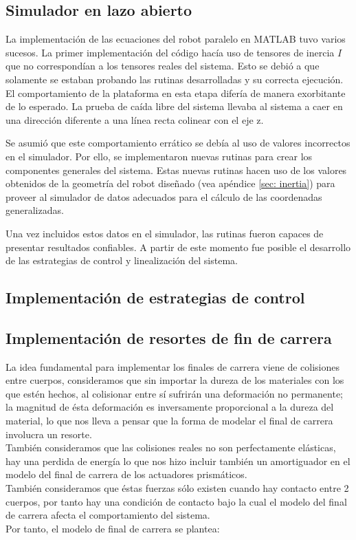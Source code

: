 \subsection{Simulador en lazo abierto}
La implementación de las ecuaciones del robot paralelo en 
MATLAB tuvo varios sucesos.
La primer implementación del código hacía uso de tensores de 
inercia $I$ que no correspondían a los tensores reales del sistema.
Esto se debió a que solamente se estaban probando las
rutinas desarrolladas y su correcta ejecución.
El comportamiento de la plataforma en esta etapa difería 
de manera exorbitante de lo esperado.
La prueba de caída libre del sistema llevaba al sistema a caer en 
una dirección diferente a una línea recta colinear con el eje z.

Se asumió que este comportamiento errático se debía al uso de 
valores incorrectos en el simulador.
Por ello, se implementaron nuevas rutinas para 
crear los componentes generales del sistema.
Estas nuevas rutinas hacen uso de los valores obtenidos de la
geometría del robot diseñado (vea apéndice \ref{sec: inertia})
para proveer al simulador de datos adecuados para
el cálculo de las coordenadas generalizadas.

Una vez incluidos estos datos en el simulador, 
las rutinas fueron capaces de 
presentar resultados confiables.
A partir de este momento fue posible el desarrollo
de las estrategias de control y 
linealización del sistema.

\subsection{Implementación de estrategias de control}





\subsection{Implementación de resortes de fin de carrera}
La idea fundamental para implementar los finales de carrera viene de colisiones entre cuerpos, consideramos que sin importar la dureza de los materiales con los que estén hechos, al colisionar entre sí sufrirán una deformación no permanente; la magnitud de ésta deformación es inversamente proporcional a la dureza del material, lo que nos lleva a pensar que la forma de modelar el final de carrera involucra un resorte.\\
También consideramos que las colisiones reales no son perfectamente elásticas, hay una perdida de energía lo que nos hizo incluir también un amortiguador en el modelo del final de carrera de los actuadores prismáticos.\\
También consideramos que éstas fuerzas sólo existen cuando hay contacto entre 2 cuerpos, por tanto hay una condición de contacto bajo la cual el modelo del final de carrera afecta el comportamiento del sistema.\\
 Por tanto, el modelo de final de carrera se plantea:
 
